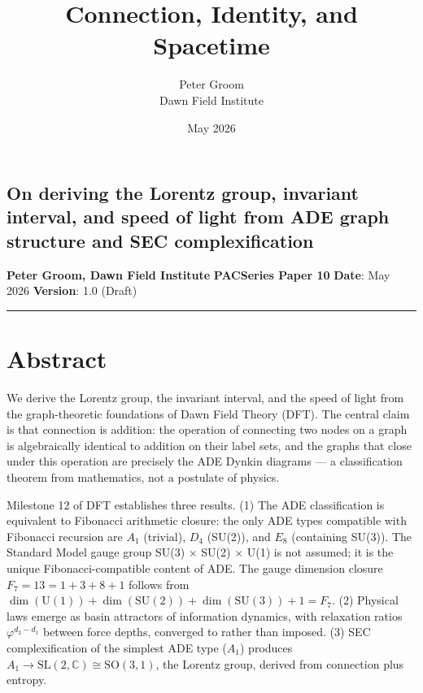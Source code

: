 \documentclass[11pt,a4paper]{article}
\title{Connection, Identity, and Spacetime}
\author{Peter Groom \\ Dawn Field Institute}
\date{May 2026}
\begin{document}
\maketitle

\subsection*{On deriving the Lorentz group, invariant interval, and speed of light from ADE graph structure and SEC complexification}

\textbf{Peter Groom, Dawn Field Institute} \textbf{PACSeries Paper 10} \textbf{Date}: May 2026 \textbf{Version}: 1.0 (Draft)

\begin{center}\rule{0.5\linewidth}{0.4pt}\end{center}

\section*{Abstract}

We derive the Lorentz group, the invariant interval, and the speed of light from the graph-theoretic foundations of Dawn Field Theory (DFT). The central claim is that connection is addition: the operation of connecting two nodes on a graph is algebraically identical to addition on their label sets, and the graphs that close under this operation are precisely the ADE Dynkin diagrams — a classification theorem from mathematics, not a postulate of physics.

Milestone 12 of DFT establishes three results. (1) The ADE classification is equivalent to Fibonacci arithmetic closure: the only ADE types compatible with Fibonacci recursion are $A_1$ (trivial), $D_4$ (SU(2)), and $E_8$ (containing SU(3)). The Standard Model gauge group SU(3) $\times$ SU(2) $\times$ U(1) is not assumed; it is the unique Fibonacci-compatible content of ADE. The gauge dimension closure $F_7 = 13 = 1 + 3 + 8 + 1$ follows from $\dim(\text{U}(1)) + \dim(\text{SU}(2)) + \dim(\text{SU}(3)) + 1 = F_7$. (2) Physical laws emerge as basin attractors of information dynamics, with relaxation ratios $\varphi^{d_2 - d_1}$ between force depths, converged to rather than imposed. (3) SEC complexification of the simplest ADE type ($A_1$) produces $A_1 \to \text{SL}(2,\mathbb{C}) \cong \text{SO}(3,1)$, the Lorentz group, derived from connection plus entropy.
\end{document}
